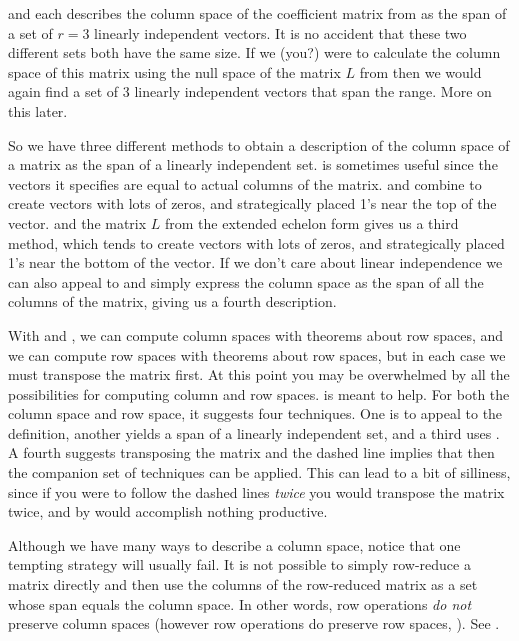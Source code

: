 %
 and  each describes the column space of the coefficient matrix from  as the span of a set of $r=3$ linearly independent vectors.  It is no accident that these two different sets both have the same size.  If we (you?) were to calculate the column space of this matrix using the null space of the matrix $L$ from  then we would again find a set of 3 linearly independent vectors that span the range.  More on this later.\par
%
So we have three different methods to obtain a description of the column space of a matrix as the span of a linearly independent set.   is sometimes useful since the vectors it specifies are equal to actual columns of the matrix.  and  combine to create vectors with lots of zeros, and strategically placed 1's near the top of the vector.    and the matrix $L$ from the extended echelon form gives us a third method, which tends to create vectors with lots of zeros, and strategically placed 1's near the bottom of the vector.   If we don't care about linear independence we can also appeal to  and simply express the column space as the span of all the columns of the matrix, giving us a fourth description.\par
%
With  and , we can compute column spaces with theorems about row spaces, and we can compute row spaces with theorems about row spaces, but in each case we must transpose the matrix first.  At this point you may be overwhelmed by all the possibilities for computing column and row spaces.   is meant to help.  For both the column space and row space, it suggests four techniques.  One is to appeal to the definition, another yields a span of a linearly independent set, and a third uses .  A fourth suggests transposing the matrix and the dashed line implies that then the companion set of techniques can be applied.  This can lead to a bit of silliness, since if you were to follow the dashed lines {\em twice} you would transpose the matrix twice, and by  would accomplish nothing productive.\par
%
%
Although we have many ways to describe a column space, notice that one tempting strategy will usually fail.  It is not possible to simply row-reduce a matrix directly and then use the columns of the row-reduced matrix as a set whose span equals the column space.  In other words, row operations {\em do not} preserve column spaces (however row operations do preserve row spaces, ).  See .
%





